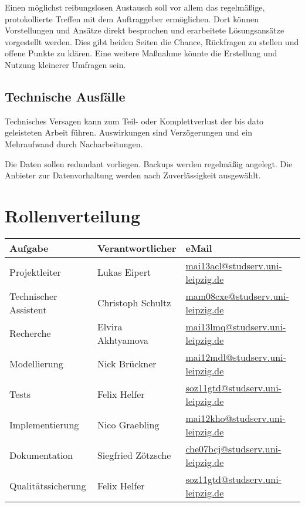 \massnamen
  Einen möglichst reibungslosen Austausch soll vor allem das regelmäßige, protokollierte Treffen mit dem Auftraggeber ermöglichen. Dort können Vorstellungen und Ansätze direkt besprochen und erarbeitete Lösungsansätze vorgestellt werden. Dies gibt beiden Seiten die Chance, Rückfragen zu stellen und offene Punkte zu klären. Eine weitere Maßnahme könnte die Erstellung und Nutzung kleinerer Umfragen sein.



\subsection{Technische Ausfälle}\label{r9}
Technisches Versagen kann zum Teil- oder Komplettverlust der bis dato geleisteten Arbeit führen. Auswirkungen sind Verzögerungen und ein Mehraufwand durch Nacharbeitungen.

\massnamen
Die Daten sollen redundant vorliegen. Backups werden regelmäßig angelegt. Die Anbieter zur Datenvorhaltung werden nach Zuverlässigkeit ausgewählt.




\section{Rollenverteilung}

\bgroup
\sf
\begin{tabular}{lll}
\toprule
\textbf{Aufgabe} & \textbf{Verantwortlicher} & \textbf{eMail} \\\midrule

Projektleiter & Lukas Eipert & \url{mai13acl@studserv.uni-leipzig.de}\\
Technischer Assistent & Christoph Schultz & \url{mam08cxe@studserv.uni-leipzig.de}\\
Recherche & Elvira Akhtyamova & \url{mai13lmq@studserv.uni-leipzig.de}\\
Modellierung & Nick Brückner & \url{mai12mdl@studserv.uni-leipzig.de}\\
Tests & Felix Helfer & \url{soz11gtd@studserv.uni-leipzig.de}\\
Implementierung & Nico Graebling & \url{mai12kho@studserv.uni-leipzig.de}\\
Dokumentation & Siegfried Zötzsche & \url{che07bcj@studserv.uni-leipzig.de}\\
Qualitätssicherung & Felix Helfer & \url{soz11gtd@studserv.uni-leipzig.de}\\
\bottomrule
\end{tabular}
\egroup

